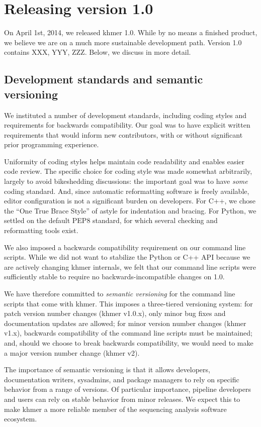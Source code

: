 \documentclass[11pt]{article}
\begin{document}
\section{Releasing version 1.0}

On April 1st, 2014, we released khmer 1.0.  While by no means a finished
product, we believe we are on a much more sustainable development path.
Version 1.0 contains XXX, YYY, ZZZ.
Below, we discuss in more detail.

\subsection{Development standards and semantic versioning}

We instituted a number of development standards, including coding styles
and requirements for backwards compatibility.  Our goal was to have
explicit written requirements that would inform new contributors, with
or without significant prior programming experience.

Uniformity of coding styles helps maintain code readability and
enables easier code review.  The specific choice for coding style was
made somewhat arbitrarily, largely to avoid bikeshedding discussions:
the important goal was to have {\em some} coding standard.  And, since
automatic reformatting software is freely available, editor
configuration is not a significant burden on developers.  For C++, we
chose the ``One True Brace Style'' of astyle for indentation and
bracing.  For Python, we settled on the default PEP8 standard, for
which several checking and reformatting tools exist.

We also imposed a backwards compatibility requirement on our command
line scripts.  While we did not want to stabilize the Python or C++
API because we are actively changing khmer internals, we felt that
our command line scripts were sufficiently stable to require no
backwards-incompatible changes on 1.0.

We have therefore committed to {\em semantic versioning} for the
command line scripts that come with khmer.  This imposes a
three-tiered versioning system: for patch version number changes
(khmer v1.0.x), only minor bug fixes and documentation updates are
allowed; for minor version number changes (khmer v1.x), backwards
compatibility of the command line scripts must be maintained; and,
should we choose to break backwards compatibility, we would need to
make a major version number change (khmer v2).

The importance of semantic versioning is that it allows developers,
documentation writers, sysadmins, and package managers to rely on
specific behavior from a range of versions.  Of particular importance,
pipeline developers and users can rely on stable behavior from minor
releases.  We expect this to make khmer a more reliable member of the
sequencing analysis software ecosystem.
\end{document}

